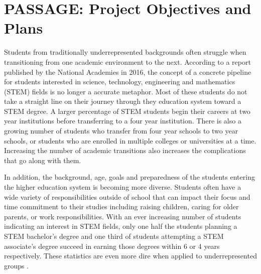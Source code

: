 \documentclass[12pt]{article}
\begin{document}
\section{\large{PASSAGE: Project Objectives and Plans}}
\vspace{-3mm}

Students from traditionally underrepresented backgrounds often struggle when transitioning from one academic environment to the next.  According to a report published by the National Academies in 2016, the concept of a concrete pipeline for students interested in science, technology, engineering and mathematics (STEM) fields is no longer a accurate metaphor.  Most of these students do not take a straight line on their journey through they education system toward a STEM degree.  A larger percentage of STEM students begin their careers at two year institutions before transferring to a four year institution.  There is also a growing number of students who transfer from four year schools to two year schools, or students who are enrolled in multiple colleges or universities at a time. Increasing the number of academic transitions also increases the complications that go along with them. 

In addition, the background, age, goals and preparedness of the students entering the higher education system is becoming more diverse. Students often have a wide variety of responsibilities outside of school that can impact their focus and time commitment to their studies including raising children, caring for older parents, or work responsibilities.  With an ever increasing number of students indicating an interest in STEM fields, only one half the students planning a STEM bachelor's degree and one third of students attempting a STEM associate's degree succeed in earning those degrees within 6 or 4 years respectively.  These statistics are even more dire when applied to underrepresented groups \citep{NAP21739}. %
\end{document}
